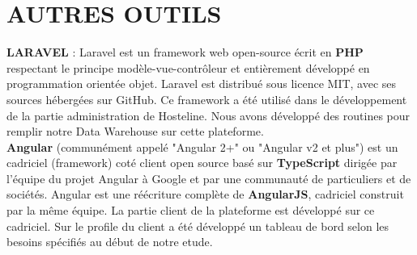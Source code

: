 \section{AUTRES OUTILS}
\textbf{LARAVEL }: Laravel est un framework web open-source écrit en \textbf{PHP} respectant le principe modèle-vue-contrôleur et entièrement développé en programmation orientée objet. Laravel est distribué sous licence MIT, avec ses sources hébergées sur GitHub. Ce framework a été utilisé dans le développement de la partie administration de Hosteline. Nous avons développé des routines pour remplir notre Data Warehouse sur cette plateforme.\\

\textbf{Angular} (communément appelé "Angular 2+" ou "Angular v2 et plus") est un cadriciel (framework) coté client open source basé sur \textbf{TypeScript} dirigée par l'équipe du projet Angular à Google et par une communauté de particuliers et de sociétés. Angular est une réécriture complète de \textbf{AngularJS}, cadriciel construit par la même équipe. La partie client de la plateforme est développé sur ce cadriciel. Sur le profile du client a été développé un tableau de bord selon les besoins spécifiés au début de notre etude.\\
